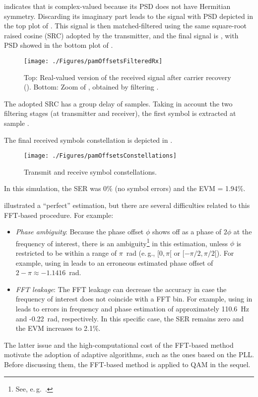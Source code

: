  indicates that  is complex-valued because its PSD does not
have Hermitian symmetry. Discarding its imaginary part leads to the signal with PSD depicted
in the top plot of . This signal is then matched-filtered using the same square-root raised cosine (SRC) adopted by the transmitter, and the final signal is , with
PSD showed in the bottom plot of .

\begin{figure}[htbp]
\centering
\texttt{[image: ./Figures/pamOffsetsFilteredRx]}
\caption[Received signal after carrier recovery.]{Top: Real-valued version of the received signal after carrier recovery (). Bottom: Zoom of , obtained by filtering .\label{fig:pamOffsetsFilteredRx}}
\end{figure}

The adopted SRC has a group delay of  samples. Taking in account the two 
filtering stages (at transmitter and receiver), the first symbol is extracted at sample .

The final received symbols constellation is depicted in .

\begin{figure}[htbp]
\centering
\texttt{[image: ./Figures/pamOffsetsConstellations]}
\caption{Transmit and receive symbol constellations.\label{fig:pamOffsetsConstellations}}
\end{figure}

In this simulation, the SER was 0\% (no symbol errors) and the EVM = 1.94\%.
\eExample

 illustrated a ``perfect'' estimation, but there are several difficulties
related to this FFT-based procedure. For example:
\begin{itemize}
	\item \emph{Phase ambiguity}: Because the phase offset $\phi$ shows off as a phase of $2\phi$ at the frequency of interest, there is an ambiguity\footnote{See, e.\,g.~\cite{Thaiupathump00}.} 
	in this estimation, unless $\phi$  is restricted to be within a range of $\pi$~rad (e.\,g., $[0,\pi[$ or $[-\pi/2, \pi/2[$). For example, using  in  leads to an erroneous estimated phase offset of $2-\pi \approx -1.1416$~rad.
	\item \emph{FFT leakage}: The FFT leakage can decrease the accuracy in case the frequency of interest does not coincide with a FFT bin.
	For example, using  in  leads to errors in frequency and phase estimation of approximately 110.6~Hz and -0.22~rad, respectively. In this specific case, the SER remains zero and the EVM increases to 2.1\%.
\end{itemize}
The latter issue and the high-computational cost of the FFT-based method motivate the adoption of adaptive algorithms, such as the ones based on the PLL. Before discussing them, the FFT-based method
is applied to QAM in the sequel.

